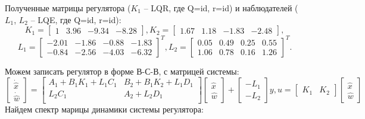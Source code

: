 Полученные матрицы регулятора ($K_1$ -- LQR, где Q=id, r=id) и наблюдателей ($L_1$, $L_2$ -- LQE, где Q=id, r=id):
\begin{equation*}
    K_1 = \begin{bmatrix}
        1 & 3.96 & -9.34 & -8.28
    \end{bmatrix},
    K_2 = \begin{bmatrix}
        1.67 & 1.18 & -1.83 & -2.48
    \end{bmatrix},
\end{equation*}
\begin{equation*}
    L_1 = \begin{bmatrix}
        -2.01 & -1.86 & -0.88 & -1.83 \\
        -0.84 & -2.56 & -4.03 & -6.32
    \end{bmatrix}^T,
    L_2 = \begin{bmatrix}
        0.05 & 0.49 & 0.25 & 0.55 \\
        1.06 & 0.78 & 0.16 & 1.26
    \end{bmatrix}^T.
\end{equation*}

Можем записать регулятор в форме В-С-В, с матрицей системы:
\begin{equation}
    \begin{bmatrix}
        \dot{\hat{x}} \\ \dot{\hat{w}}
    \end{bmatrix} =
    \begin{bmatrix}
        A_1 + B_1K_1 + L_1C_1 & B_2 + B_1K_2 + L_1D_1 \\
        L_2C_1 & A_2 + L_2D_1 \\
    \end{bmatrix}
    \begin{bmatrix}
        {\hat{x}} \\ {\hat{w}}
    \end{bmatrix} +
    \begin{bmatrix}
        -L_1 \\ -L_2 
    \end{bmatrix}y, u = \begin{bmatrix}
        K_1 & K_2 
    \end{bmatrix}\begin{bmatrix}
        {\hat{x}} \\ {\hat{w}} 
    \end{bmatrix}
\end{equation}
Найдем спектр марицы динамики системы регулятора: 

